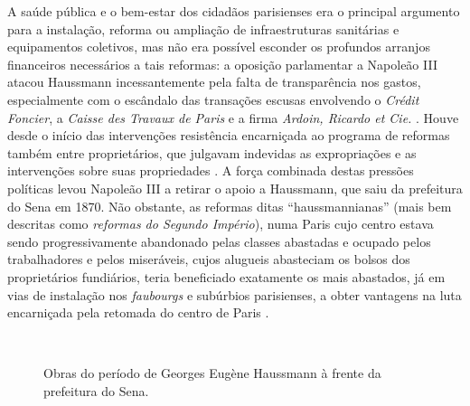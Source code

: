 A saúde pública e o bem-estar dos cidadãos parisienses era o principal argumento para a instalação, reforma ou ampliação de infraestruturas sanitárias e equipamentos coletivos, mas não era possível esconder os profundos arranjos financeiros necessários a tais reformas: a oposição parlamentar a Napoleão III atacou Haussmann incessantemente pela falta de transparência nos gastos, especialmente com o escândalo das transações escusas envolvendo o \textit{Crédit Foncier}, a \textit{Caisse des Travaux de Paris} e a firma \textit{Ardoin, Ricardo et Cie.} \cite{pinkney_paris_1957}. Houve desde o início das intervenções resistência encarniçada ao programa de reformas também entre proprietários, que julgavam indevidas as expropriações e as intervenções sobre suas propriedades \cite{paccoud_hauspropr_2012}. A força combinada destas pressões políticas levou Napoleão III a retirar o apoio a Haussmann, que saiu da prefeitura do Sena em 1870. Não obstante, as reformas ditas ``haussmannianas'' (mais bem descritas como \textit{reformas do Segundo Império}), numa Paris cujo centro estava sendo progressivamente abandonado pelas classes abastadas e ocupado pelos trabalhadores e pelos miseráveis, cujos alugueis abasteciam os bolsos dos proprietários fundiários, teria beneficiado exatamente os mais abastados, já em vias de instalação nos \textit{faubourgs} e subúrbios parisienses, a obter vantagens na luta encarniçada pela retomada do centro de Paris \cite{faure_paris_2004}.

\begin{figure}[!htp]
\centering
{}
\  %
\caption{Obras do período de Georges Eugène Haussmann à frente da prefeitura do Sena.}
\end{figure}

